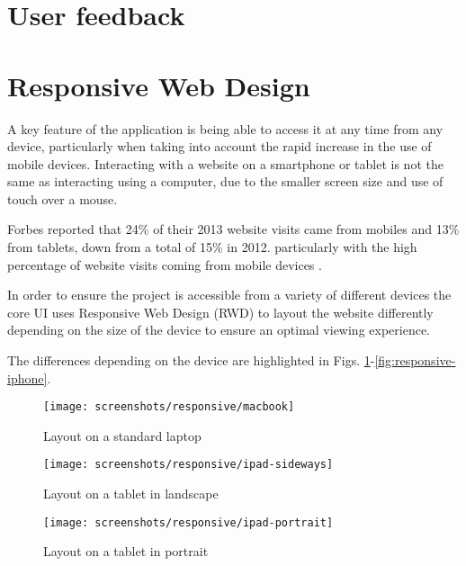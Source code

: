 
\section{User feedback}


\section[Responsive Design]{Responsive Web Design}

A key feature of the application is being able to access it at any time from any device, particularly when taking into account the rapid increase in the use of mobile devices.  Interacting with a website on a smartphone or tablet is not the same as interacting using a computer, due to the smaller screen size and use of touch over a mouse.

Forbes reported that 24\% of their 2013 website visits came from mobiles and 13\% from tablets, down from a total of 15\% in 2012. particularly with the high percentage of website visits coming from mobile devices \parencite{steimle2013responsive}.

In order to ensure the project is accessible from a variety of different devices the core UI uses Responsive Web Design (RWD) to layout the website differently depending on the size of the device to ensure an optimal viewing experience.

The differences depending on the device are highlighted in Figs. \ref{fig:responsive-macbook}-\ref{fig:responsive-iphone}.

\begin{figure}[h]
    \centering
    \texttt{[image: screenshots/responsive/macbook]}
    \caption{Layout on a standard laptop}
    \label{fig:responsive-macbook}
\end{figure}

\begin{figure}[h]
    \centering
    \texttt{[image: screenshots/responsive/ipad-sideways]}
    \caption{Layout on a tablet in landscape}
    \label{fig:responsive-ipad}
\end{figure}

\begin{figure}[h]
    \centering
    \texttt{[image: screenshots/responsive/ipad-portrait]}
    \caption{Layout on a tablet in portrait}
    \label{fig:responsive-ipad2}
\end{figure}

